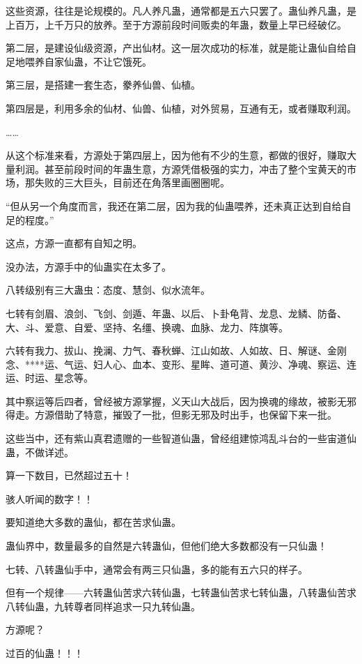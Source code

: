 \begin{this_body}
这些资源，往往是论规模的。凡人养凡蛊，通常都是五六只罢了。蛊仙养凡蛊，是上百万，上千万只的放养。至于方源前段时间贩卖的年蛊，数量上早已经破亿。

第二层，是建设仙级资源，产出仙材。这一层次成功的标准，就是能让蛊仙自给自足地喂养自家仙蛊，不让它饿死。

第三层，是搭建一套生态，豢养仙兽、仙植。

第四层是，利用多余的仙材、仙兽、仙植，对外贸易，互通有无，或者赚取利润。

……

从这个标准来看，方源处于第四层上，因为他有不少的生意，都做的很好，赚取大量利润。甚至前段时间的年蛊生意，方源凭借极强的实力，冲击了整个宝黄天的市场，那失败的三大巨头，目前还在角落里画圈圈呢。

“但从另一个角度而言，我还在第二层，因为我的仙蛊喂养，还未真正达到自给自足的程度。”

这点，方源一直都有自知之明。

没办法，方源手中的仙蛊实在太多了。

八转级别有三大蛊虫：态度、慧剑、似水流年。

七转有剑眉、浪剑、飞剑、剑遁、年蛊、以后、卜卦龟背、龙息、龙鳞、防备、大、斗、爱意、自爱、坚持、名缰、换魂、血脉、龙力、阵旗等。

六转有我力、拔山、挽澜、力气、春秋蝉、江山如故、人如故、日、解谜、金刚念、****运、气运、妇人心、血本、变形、星眸、道可道、黄沙、净魂、察运、连运、时运、星念等。

其中察运等后四者，曾经被方源掌握，义天山大战后，因为换魂的缘故，被影无邪得走。方源借助了特意，摧毁了一批，但影无邪及时出手，也保留下来一批。

这些当中，还有紫山真君遗赠的一些智道仙蛊，曾经组建惊鸿乱斗台的一些宙道仙蛊，不做详述。

算一下数目，已然超过五十！

骇人听闻的数字！！

要知道绝大多数的蛊仙，都在苦求仙蛊。

蛊仙界中，数量最多的自然是六转蛊仙，但他们绝大多数都没有一只仙蛊！

七转、八转蛊仙手中，通常会有两三只仙蛊，多的能有五六只的样子。

但有一个规律——六转蛊仙苦求六转仙蛊，七转蛊仙苦求七转仙蛊，八转蛊仙苦求八转仙蛊，九转尊者同样追求一只九转仙蛊。

方源呢？

过百的仙蛊！！！


\end{this_body}
